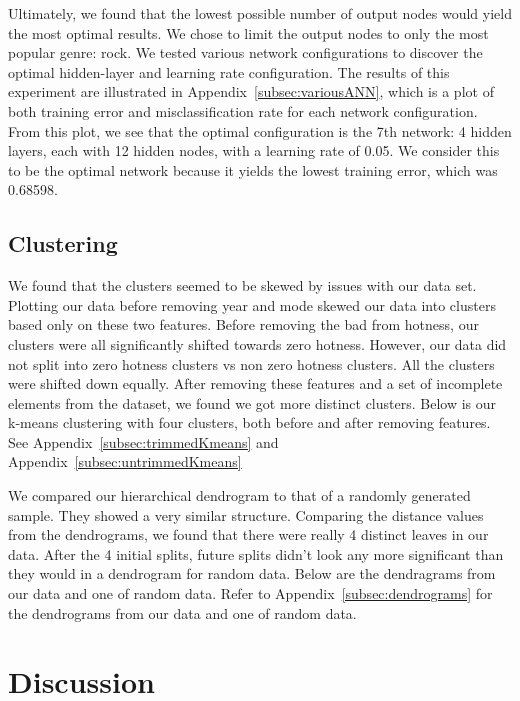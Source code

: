 \documentclass[12pt]{article}
\begin{document}
Ultimately, we found that the lowest possible number of output nodes would yield the most optimal results. We chose to limit the output nodes to only the most popular genre: rock. We tested various network configurations to discover the optimal hidden-layer and learning rate configuration. The results of this experiment are illustrated in Appendix~\ref{subsec:variousANN}, which is a plot of both training error and misclassification rate for each network configuration. From this plot, we see that the optimal configuration is the 7th network: 4 hidden layers, each with 12 hidden nodes, with a learning rate of 0.05. We consider this to be the optimal network because it yields the lowest training error, which was 0.68598.
\subsection{Clustering}
\label{subsec:clusteringResults}
We found that the clusters seemed to be skewed by issues with our data set. Plotting our data before removing year and mode skewed our data into clusters based only on these two features. Before removing the bad from hotness, our clusters were all significantly shifted towards zero hotness. However, our data did not split into zero hotness clusters vs non zero hotness clusters. All the clusters were shifted down equally. After removing these features and a set of incomplete elements from the dataset, we found we got more distinct clusters. Below is our k-means clustering with four clusters, both before and after removing features.
See Appendix~\ref{subsec:trimmedKmeans} and Appendix~\ref{subsec:untrimmedKmeans}


We compared our hierarchical dendrogram to that of a randomly generated sample. They showed a very similar structure. Comparing the distance values from the dendrograms, we found that there were really 4 distinct leaves in our data. After the 4 initial splits, future splits didn't look any more significant than they would in a dendrogram for random data. Below are the dendragrams from our data and one of random data.
Refer to Appendix~\ref{subsec:dendrograms} for the dendrograms from our data and one of random data.
\section{Discussion}
\label{sec:discussion}
\end{document}
